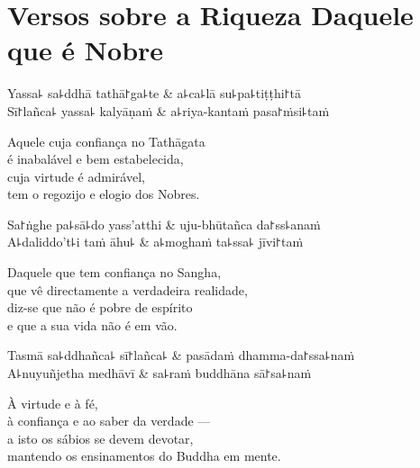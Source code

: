 \chapter{Versos sobre a Riqueza Daquele que é Nobre}


\begin{leader}
\end{leader}

\begin{twochants}
  Yassa꜕ sa꜕ddhā tathā꜓ga꜕te & a꜕ca꜕lā su꜕pa꜕tiṭṭhi꜓tā \\
  Sī꜓lañca꜕ yassa꜕ kalyāṇaṁ & a꜕riya-kantaṁ pasa꜓ṁsi꜕taṁ \\
\end{twochants}

\begin{english}
  Aquele cuja confiança no Tathāgata\\
  é inabalável e bem estabelecida,\\
  cuja virtude é admirável,\\
  tem o regozijo e elogio dos Nobres.
\end{english}

\begin{twochants}
  Sa꜓ṅghe pa꜕sā꜕do yass'atthi & uju-bhūtañca da꜓ss꜕anaṁ \\
  A꜕daliddo't꜕i taṁ āhu꜕ & a꜕moghaṁ ta꜕ssa꜕ jīvi꜓taṁ \\
\end{twochants}

\begin{english}
  Daquele que tem confiança no Sangha,\\
  que vê directamente a verdadeira realidade,\\
  diz-se que não é pobre de espírito\\
  e que a sua vida não é em vão.
\end{english}

\begin{twochants}
  Tasmā sa꜕ddhañca꜕ sī꜓lañca꜕ & pasādaṁ dhamma-da꜓ssa꜕naṁ \\
  A꜕nuyuñjetha medhāvī & sa꜕raṁ buddhāna sā꜓sa꜕naṁ \\
\end{twochants}

\begin{english}
  À virtude e à fé,\\
  à confiança e ao saber da verdade ---\\
  a isto os sábios se devem devotar,\\
  mantendo os ensinamentos do Buddha em mente.
\end{english}

